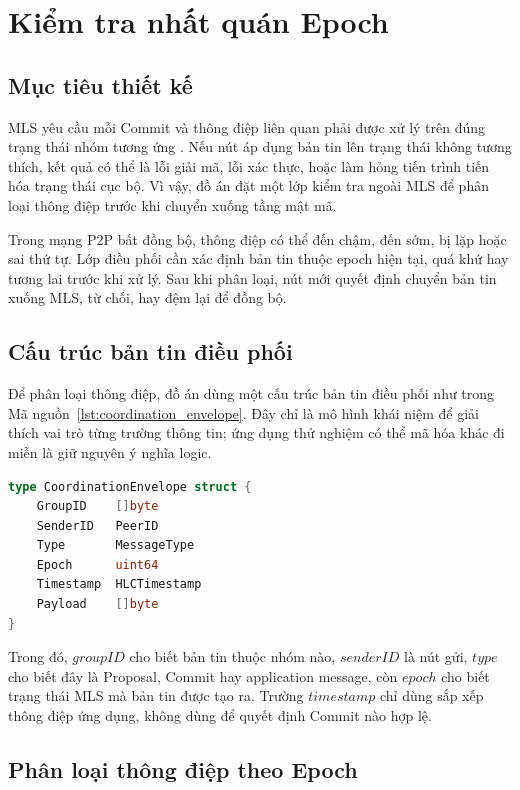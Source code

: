 \documentclass[../DoAn.tex]{subfiles}
\begin{document}
\section{Kiểm tra nhất quán Epoch}
\label{sec:epoch-checks}

\subsection{Mục tiêu thiết kế}

MLS yêu cầu mỗi Commit và thông điệp liên quan phải được xử lý trên đúng trạng thái nhóm tương ứng \cite{rfc9420}. Nếu nút áp dụng bản tin lên trạng thái không tương thích, kết quả có thể là lỗi giải mã, lỗi xác thực, hoặc làm hỏng tiến trình tiến hóa trạng thái cục bộ. Vì vậy, đồ án đặt một lớp kiểm tra ngoài MLS để phân loại thông điệp trước khi chuyển xuống tầng mật mã.

Trong mạng P2P bất đồng bộ, thông điệp có thể đến chậm, đến sớm, bị lặp hoặc sai thứ tự. Lớp điều phối cần xác định bản tin thuộc epoch hiện tại, quá khứ hay tương lai trước khi xử lý. Sau khi phân loại, nút mới quyết định chuyển bản tin xuống MLS, từ chối, hay đệm lại để đồng bộ.

\subsection{Cấu trúc bản tin điều phối}

Để phân loại thông điệp, đồ án dùng một cấu trúc bản tin điều phối như trong Mã nguồn~\ref{lst:coordination_envelope}. Đây chỉ là mô hình khái niệm để giải thích vai trò từng trường thông tin; ứng dụng thử nghiệm có thể mã hóa khác đi miễn là giữ nguyên ý nghĩa logic.

\begin{lstlisting}[language=Go, caption={Mô hình khái niệm của lớp bao điều phối}, label={lst:coordination_envelope}]
type CoordinationEnvelope struct {
    GroupID    []byte
    SenderID   PeerID
    Type       MessageType
    Epoch      uint64
    Timestamp  HLCTimestamp
    Payload    []byte
}
\end{lstlisting}

Trong đó, $groupID$ cho biết bản tin thuộc nhóm nào, $senderID$ là nút gửi, $type$ cho biết đây là Proposal, Commit hay application message, còn $epoch$ cho biết trạng thái MLS mà bản tin được tạo ra. Trường $timestamp$ chỉ dùng sắp xếp thông điệp ứng dụng, không dùng để quyết định Commit nào hợp lệ.

\subsection{Phân loại thông điệp theo Epoch}
\end{document}

